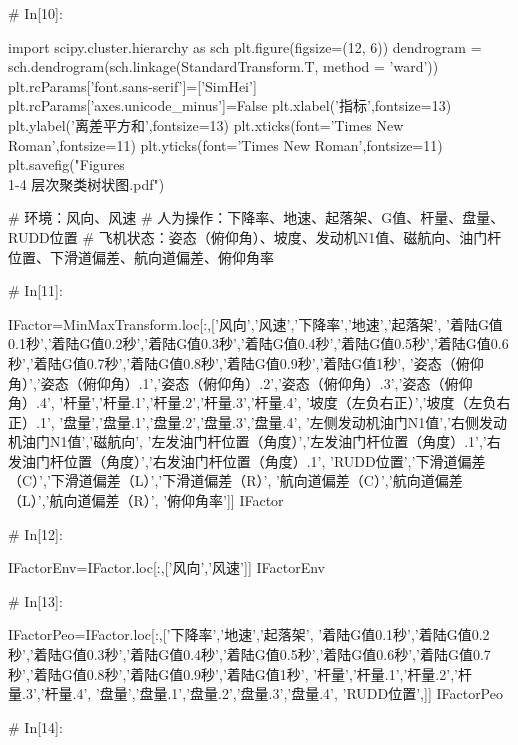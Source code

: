 \documentclass{MathorCupModeling}
\begin{document}
\begin{python}
# In[10]:


import scipy.cluster.hierarchy as sch
plt.figure(figsize=(12, 6))
dendrogram = sch.dendrogram(sch.linkage(StandardTransform.T, method = 'ward'))
plt.rcParams['font.sans-serif']=['SimHei']
plt.rcParams['axes.unicode_minus']=False
plt.xlabel('指标',fontsize=13)
plt.ylabel('离差平方和',fontsize=13)
plt.xticks(font='Times New Roman',fontsize=11)
plt.yticks(font='Times New Roman',fontsize=11)
plt.savefig("Figures\\1-4 层次聚类树状图.pdf")


# 环境：风向、风速
# 人为操作：下降率、地速、起落架、G值、杆量、盘量、RUDD位置
# 飞机状态：姿态（俯仰角）、坡度、发动机N1值、磁航向、油门杆位置、下滑道偏差、航向道偏差、俯仰角率

# In[11]:


IFactor=MinMaxTransform.loc[:,['风向','风速','下降率','地速','起落架',
                               '着陆G值0.1秒','着陆G值0.2秒','着陆G值0.3秒','着陆G值0.4秒','着陆G值0.5秒','着陆G值0.6秒','着陆G值0.7秒','着陆G值0.8秒','着陆G值0.9秒','着陆G值1秒',
                               '姿态（俯仰角）','姿态（俯仰角）.1','姿态（俯仰角）.2','姿态（俯仰角）.3','姿态（俯仰角）.4',
                               '杆量','杆量.1','杆量.2','杆量.3','杆量.4',
                               '坡度（左负右正）','坡度（左负右正）.1',
                               '盘量','盘量.1','盘量.2','盘量.3','盘量.4',
                               '左侧发动机油门N1值','右侧发动机油门N1值','磁航向',
                               '左发油门杆位置（角度）','左发油门杆位置（角度）.1','右发油门杆位置（角度）','右发油门杆位置（角度）.1',
                               'RUDD位置','下滑道偏差（C）','下滑道偏差（L）','下滑道偏差（R）',
                               '航向道偏差（C）','航向道偏差（L）','航向道偏差（R）',
                               '俯仰角率']]
IFactor


# In[12]:


IFactorEnv=IFactor.loc[:,['风向','风速']]
IFactorEnv


# In[13]:


IFactorPeo=IFactor.loc[:,['下降率','地速','起落架',
                          '着陆G值0.1秒','着陆G值0.2秒','着陆G值0.3秒','着陆G值0.4秒','着陆G值0.5秒','着陆G值0.6秒','着陆G值0.7秒','着陆G值0.8秒','着陆G值0.9秒','着陆G值1秒',
                          '杆量','杆量.1','杆量.2','杆量.3','杆量.4',
                          '盘量','盘量.1','盘量.2','盘量.3','盘量.4',
                          'RUDD位置',]]
IFactorPeo


# In[14]:



\end{python}
\end{document}
